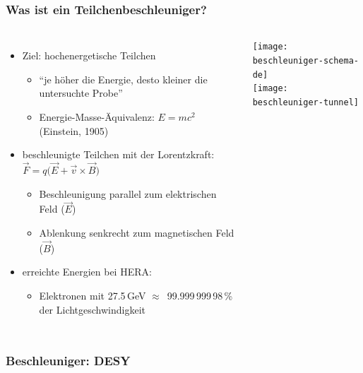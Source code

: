 \documentclass[10pt,t]{beamer}
\begin{document}
\begin{frame}
\frametitle{Was ist ein Teilchenbeschleuniger?}
\vspace*{-2\baselineskip}
\begin{columns}[c]
\begin{itemize}
    \item Ziel: hochenergetische Teilchen
    \begin{itemize}
        \item ``je höher die Energie, desto kleiner die untersuchte Probe''
        \item Energie-Masse-Äquivalenz: $E=mc^2$ (Einstein, 1905)
    \end{itemize}
    \item beschleunigte Teilchen mit der Lorentzkraft: $\vec{F}=q\Big(\vec{E}+\vec{v}\times\vec{B}\Big)$
    \begin{itemize}
        \item Beschleunigung parallel zum elektrischen Feld ($\vec{E}$)
        \item Ablenkung senkrecht zum magnetischen Feld ($\vec{B}$)
    \end{itemize}
    \item erreichte Energien bei HERA:
    \begin{itemize}
        \item Elektronen mit 27.5\,GeV $\approx$~99.999\,999\,98\,\% der Lichtgeschwindigkeit
    \end{itemize}
\end{itemize}
\centering
    \texttt{[image: beschleuniger-schema-de]} \\[1em]
    \texttt{[image: beschleuniger-tunnel]}
\end{columns}
\end{frame}

%
%

\begin{frame}
\frametitle{Beschleuniger: DESY}
\vspace*{-2\baselineskip}
\end{frame}
\end{document}

